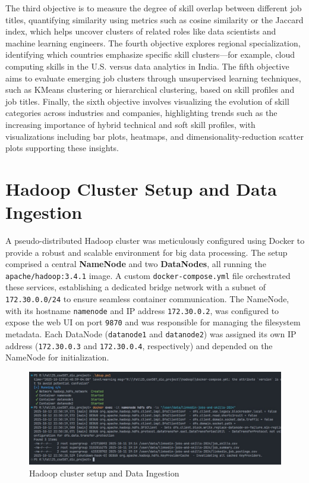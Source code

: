 \documentclass[conference]{IEEEtran}
\begin{document}
The third objective is to measure the degree of skill overlap between different job titles, quantifying similarity using metrics such as cosine similarity or the Jaccard index, which helps uncover clusters of related roles like data scientists and machine learning engineers. The fourth objective explores regional specialization, identifying which countries emphasize specific skill clusters—for example, cloud computing skills in the U.S. versus data analytics in India. The fifth objective aims to evaluate emerging job clusters through unsupervised learning techniques, such as KMeans clustering or hierarchical clustering, based on skill profiles and job titles. Finally, the sixth objective involves visualizing the evolution of skill categories across industries and companies, highlighting trends such as the increasing importance of hybrid technical and soft skill profiles, with visualizations including bar plots, heatmaps, and dimensionality-reduction scatter plots supporting these insights.

\section{\textbf{Hadoop Cluster Setup and Data Ingestion}}
A pseudo-distributed Hadoop cluster was meticulously configured using Docker to provide a robust and scalable environment for big data processing. The setup comprised a central \textbf{NameNode} and two \textbf{DataNodes}, all running the \texttt{apache/hadoop:3.4.1} image. A custom \texttt{docker-compose.yml} file orchestrated these services, establishing a dedicated bridge network with a subnet of \texttt{172.30.0.0/24} to ensure seamless container communication. The NameNode, with its hostname \texttt{namenode} and IP address \texttt{172.30.0.2}, was configured to expose the web UI on port \texttt{9870} and was responsible for managing the filesystem metadata. Each DataNode (\texttt{datanode1} and \texttt{datanode2}) was assigned its own IP address (\texttt{172.30.0.3} and \texttt{172.30.0.4}, respectively) and depended on the NameNode for initialization.
\begin{figure}[h]
    \centering
    \includegraphics[width=\textwidth]{ih.jpeg}
    \caption{Hadoop cluster setup and Data Ingestion}
    \label{fig:placeholder}
\end{figure}
\end{document}
